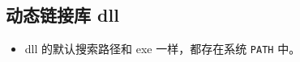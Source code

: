 
\subsection{动态链接库 dll}

\begin{itemize}
\item dll 的默认搜索路径和 exe 一样，都存在系统 \verb`PATH` 中。
\end{itemize}
